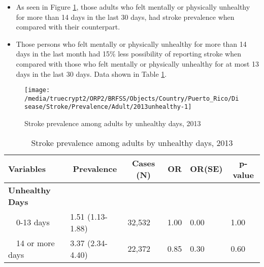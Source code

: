 \newpage
\begin{itemize}

\item As seen in Figure \ref{fig:unhlthy.Stroke.2013}, those adults who felt mentally or physically unhealthy for more than 14 days in the last 30 days, had  
stroke prevalence when compared with their counterpart.


\item Those persons who felt mentally or physically unhealthy for more than 14 days in the last month had 15\% less possibility of reporting stroke when compared with those who felt mentally or physically unhealthy for at most 13 days in the last 30 days. Data shown in Table \ref{tab:unhlthy.Stroke.2013}.

\end{itemize}

\begin{figure}[H]
\caption{Stroke prevalence among adults by unhealthy days, 2013}
\label{fig:unhlthy.Stroke.2013}

\begin{knitrout}
\color{fgcolor}

{\centering \texttt{[image: /media/truecrypt2/ORP2/BRFSS/Objects/Country/Puerto\_Rico/Disease/Stroke/Prevalence/Adult/2013unhealthy-1]} 

}



\end{knitrout}
\end{figure}

\begin{table}[H]
\caption{Stroke prevalence among adults by unhealthy days, 2013\label{tab:unhlthy.Stroke.2013}} 
\begin{center}
\begin{tabular}{llllll}
\hline\hline
\multicolumn{1}{l}{Variables}&\multicolumn{1}{c}{Prevalence}&\multicolumn{1}{c}{Cases (N)}&\multicolumn{1}{c}{OR}&\multicolumn{1}{c}{OR(SE)}&\multicolumn{1}{c}{p-value}\tabularnewline
\hline
{\bfseries Unhealthy Days}&&&&&\tabularnewline
~~0-13 days&1.51 (1.13-1.88)&32,532&1.00&0.00&1.00\tabularnewline
~~14 or more days&3.37 (2.34-4.40)&22,372&0.85&0.30&0.60\tabularnewline
\hline
\end{tabular}\end{center}

\end{table}



